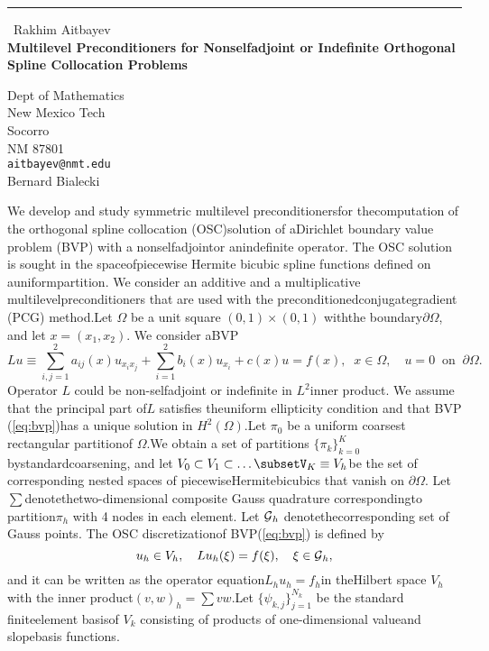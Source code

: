 \documentclass{report}
\begin{document}
\begin{center}
\rule{6in}{1pt} \
{\large Rakhim Aitbayev \\
{\bf Multilevel Preconditioners for Nonselfadjoint or Indefinite Orthogonal Spline Collocation Problems}}

Dept of Mathematics \\ New Mexico Tech \\ Socorro \\ NM 87801
\\
{\tt aitbayev@nmt.edu}\\
Bernard Bialecki\end{center}

\newcommand{\GP}{\mbox{${\cal G}$}}\newcommand{\SH}{\mbox{$\scriptscriptstyle H^{2}(\Omega)$}}\newcommand{\SL}{\mbox{$\scriptscriptstyle L^{2}(\Omega)$}}We develop and study symmetric multilevel preconditionersfor thecomputation of the orthogonal spline collocation (OSC)solution of aDirichlet boundary value problem (BVP) with a nonselfadjointor anindefinite operator.
The OSC solution is sought in the spaceofpiecewise Hermite bicubic spline functions defined on auniformpartition.
We consider an additive and a multiplicative multilevelpreconditioners that are used with the preconditionedconjugategradient (PCG) method.Let $\Omega$ be a unit square $(0,1)\times(0,1)$ withthe boundary$\partial\Omega$,
and let $x=(x_1,x_2)$.
We consider aBVP\begin{equation}\label{eq:bvp}Lu\equiv\sum_{i,j=1}^{2} a_{ij}(x)u_{x_ix_j}+\sum_{i=1}^{2}b_i(x)u_{x_i} +c(x)u = f(x),\;\;x\in\Omega,\quad u=0 \;\;\mbox{on}\;\;\partial\Omega.\end{equation}Operator $L$ could be non-selfadjoint or indefinite in $L^2$inner product.
We assume that the principal part of$L$ satisfies theuniform ellipticity condition and that BVP (\ref{eq:bvp})has a unique solution in $H^2(\Omega)$.Let $\pi_0$ be a uniform coarsest rectangular partitionof $\Omega$.We obtain a set of partitions $\{\pi_k\}_{k=0}^{K}$ bystandardcoarsening,
and let $V_0\subset V_1\subset\ldots\subsetV_K\equiv V_h$be the set of corresponding nested spaces of piecewiseHermitebicubics that vanish on $\partial\Omega$.
Let $\sum$denotethetwo-dimensional composite Gauss quadrature correspondingto partition$\pi_h$ with 4 nodes in each element.
Let $\GP_h$ denotethecorresponding set of Gauss points.
The OSC discretizationof BVP(\ref{eq:bvp}) is defined by\begin{equation}\label{eq:osc}u_h\in V_h,\quad Lu_h(\xi)=f(\xi),\quad\xi\in\GP_h,\end{equation}and it can be written as the operator equation$L_hu_h=f_h$in theHilbert space $V_h$ with the inner product$(v,w)_h=\sum vw$.Let $\{\psi_{k,j}\}_{j=1}^{N_k}$ be the standard finiteelement basisof $V_k$ consisting of products of one-dimensional valueand slopebasis functions.
\end{document}
